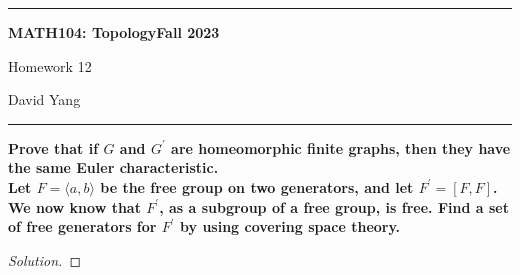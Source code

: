 \documentclass[11pt]{article}
\newenvironment{solution}
  {\renewcommand\qedsymbol{$\blacksquare$}\begin{proof}[Solution]}
  {\end{proof}}
\begin{document}
	\hrule
	\begin{center}
        \textbf{MATH104: Topology}\hfill \textbf{Fall 2023}\newline

		{\Large Homework 12}

		David Yang
	\end{center}

\hrule

\vspace{1em}

\textbf{Prove that if $G$ and $G^{\prime}$ are homeomorphic finite graphs, then they have the same Euler characteristic.} \\

\textbf{Let $F = \langle a, b\rangle$ be the free group on two generators, and let $F^{\prime} = [F, F]$. We now know that $F^{\prime}$, as a subgroup of a free group, is free.
Find a set of free generators for $F^{\prime}$ by using covering space theory.}

\begin{solution}
    
\end{solution}
\end{document}
